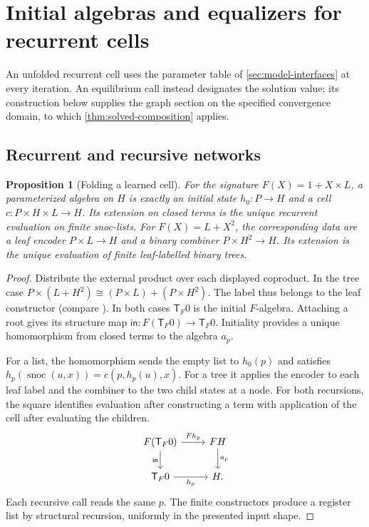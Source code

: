 \documentclass[11pt,a4paper]{article}
\newtheorem{proposition}[proposition]{Proposition}
\theoremstyle{definition}
\theoremstyle{remark}\newaliascnt{remark}{theorem}
\numberwithin{equation}{section}
\begin{document}
\section{Initial algebras and equalizers for recurrent cells}\label{sec:equilibrium}

An unfolded recurrent cell uses the parameter table of \cref{sec:model-interfaces} at every iteration. An equilibrium call instead designates the solution value; its construction below supplies the graph section on the specified convergence domain, to which \cref{thm:solved-composition} applies.

\subsection{Recurrent and recursive networks}
\begin{proposition}[Folding a learned cell]\label{thm:fold}
For the signature $F(X)=1+X\times L$, a parameterized algebra on $H$ is exactly an initial state $h_0:P\to H$ and a cell $c:P\times H\times L\to H$. Its extension on closed terms is the unique recurrent evaluation on finite snoc-lists. For $F(X)=L+X^2$, the corresponding data are a leaf encoder $P\times L\to H$ and a binary combiner $P\times H^2\to H$. Its extension is the unique evaluation of finite leaf-labelled binary trees.
\end{proposition}
\begin{proof}
Distribute the external product over each displayed coproduct. In the tree case
$P\times(L+H^2)\cong(P\times L)+(P\times H^2)$. The label thus belongs to the leaf constructor (compare \cite[Examples I.2 and J.3]{cdl}). In both cases $\mathsf T_F0$ is the initial $F$-algebra. Attaching a root gives its structure map $\mathsf{in}:F(\mathsf T_F0)\to\mathsf T_F0$. Initiality provides a unique homomorphism from closed terms to the algebra $a_p$.

For a list, the homomorphism sends the empty list to $h_0(p)$ and satisfies $h_p(\operatorname{snoc}(u,x))=c(p,h_p(u),x)$. For a tree it applies the encoder to each leaf label and the combiner to the two child states at a node. For both recursions, the square identifies evaluation after constructing a term with application of the cell after evaluating the children.
\[
\begin{tikzcd}
 F(\mathsf T_F0)\arrow[r,"Fh_p"]\arrow[d,"\mathsf{in}"']&FH\arrow[d,"a_p"]\\
 \mathsf T_F0\arrow[r,"h_p"']&H .
\end{tikzcd}
\]
Each recursive call reads the same $p$. The finite constructors produce a register list by structural recursion, uniformly in the presented input shape.
\end{proof}
\end{document}

